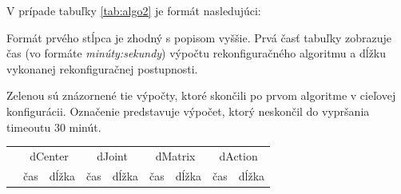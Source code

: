 \documentclass[
  printed, %
  oneside, %
  notable,   %
  nolof,     %
  nolot,     %
]{fithesis3}
\begin{document}
V prípade tabuľky \ref{tab:algo2} je formát nasledujúci: 

Formát prvého stĺpca je zhodný s popisom vyššie. Prvá časť tabuľky zobrazuje čas (vo formáte \textit{minúty:sekundy}) výpočtu rekonfiguračného algoritmu a dĺžku vykonanej rekonfiguračnej postupnosti. 

\colorbox{table-green}{Zelenou} sú znázornené tie výpočty, ktoré skončili po prvom algoritme v cieľovej konfigurácii. Označenie \uv{--} predstavuje výpočet, ktorý neskončil do vypršania timeoutu 30 minút.

\begin{table}[hp!]
\centering
\begin{tabular}{c|cc|cc|cc|cc}
\multirow{2}{*}{} & \multicolumn{2}{c|}{dCenter} & \multicolumn{2}{c|}{dJoint} & \multicolumn{2}{c|}{dMatrix} & \multicolumn{2}{c}{dAction} \\
 & čas & dĺžka & čas & dĺžka & čas & dĺžka & čas & dĺžka \\ \hline


\end{tabular}
\end{table}
\end{document}
